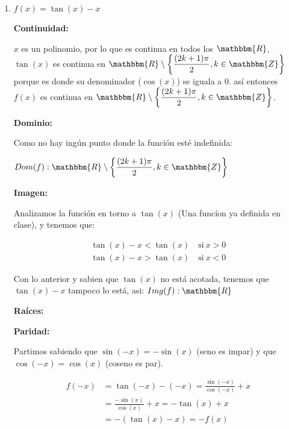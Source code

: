 \documentclass[12pt]{article}
\begin{document}
\begin{enumerate}[\hspace{9px} a)]
    \item \(f(x)=\tan(x)-x\)\bigskip
    
        \textbf{Continuidad: }\medskip

            $x$ es un polinomio, por lo que es continua en todos los $\mathbbm{R}$, \(\tan(x)\) es continua en \(\mathbbm{R}\setminus\displaystyle\left\{\frac{(2k+1)\pi}{2}, k\in\mathbbm{Z}\right\}\) porque es donde su denominador (\(\cos(x)\)) se iguala a 0. as\'i entonces \(f(x)\) es continua en \(\mathbbm{R}\setminus\displaystyle\left\{\frac{(2k+1)\pi}{2}, k\in\mathbbm{Z}\right\}\).\bigskip
        
        \textbf{Dominio: }\medskip
            
            Como no hay ing\'un punto donde la funci\'on est\'e indefinida:\medskip

            \(Dom(f):\mathbbm{R}\setminus\displaystyle\left\{\frac{(2k+1)\pi}{2}, k\in\mathbbm{Z}\right\}\)\bigskip

        \textbf{Imagen: }\medskip

            Analizamos la funci\'on en torno a $\tan(x)$ (Una func\'ion ya definida en clase), y tenemos que:

            \begin{align*}
                \tan(x)-x<\tan(x) \quad \text{si} \ x>0\\
                \tan(x)-x>\tan(x) \quad \text{si} \ x<0
            \end{align*}

            Con lo anterior y sabien que \(\tan(x)\) no est\'a acotada, tenemos que \(\tan(x)-x\) tampoco lo est\'a, asi: \(Img(f): \mathbbm{R}\)\bigskip

        \textbf{Ra\'ices: }\medskip

        \textbf{Paridad: }\medskip

            Partimos sabiendo que \(\sin(-x)=-\sin(x)\) (seno es impar) y que \(\cos(-x)=\cos(x)\) (coseno es par).

            \begin{align*}
                f(-x)&=\tan(-x)-(-x)=\frac{\sin(-x)}{\cos(-x)}+x \\
                &= \frac{-\sin(x)}{\cos(x)}+x = -\tan(x)+x \\
                &= -(\tan(x)-x)= -f(x)
            \end{align*}


\end{enumerate}
\end{document}
